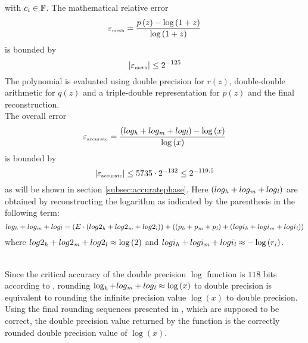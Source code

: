 with $c_i \in \F$.
The mathematical relative error 
$$\epsilon_{\mbox{\tiny meth}} = \frac{p\left( z \right) - \log\left( 1 + z \right)}{\log\left( 1 + z \right)}$$
is bounded by
$$\left \vert \epsilon_{\mbox{\tiny meth}} \right \vert \leq  2^{-125}$$
The polynomial is evaluated using double precision for $r\left( z \right)$, double-double arithmetic for
$q\left( z \right)$ and a triple-double representation for $p\left( z \right)$ and the final reconstruction.\\
The overall error 
$$\epsilon_{\mbox{\tiny accurate}} = \frac{\left( log_\hi + log_\mi + log_\lo \right) - \log\left( x \right)}{\log\left( x \right)}$$
is bounded by 
$$\left \vert \epsilon_{\mbox{\tiny accurate}} \right \vert \leq 5735 \cdot 2^{-132} \leq 2^{-119.5}$$
as will be shown in section \ref{subsec:accuratephase}. Here $\left( log_\hi + log_\mi + log_\lo \right)$ 
are obtained by reconstructing the logarithm as indicated by the parenthesis in the following term:
$$log_\hi + log_\mi + log_\lo = \left(E \cdot \left( log2_\hi + log2_\mi + log2_\lo \right) \right) + 
\left( \left( p_\hi + p_\mi + p_\lo \right) + \left(logi_\hi + logi_\mi + logi_\lo \right) \right)$$
where
$log2_\hi + log2_\mi + log2_\lo \approx \log\left( 2 \right)$ and $logi_\hi + logi_\mi + logi_\lo \approx -\log\left(r_i \right)$.\\ ~ \par
Since the critical accuracy of the double precision $\log$ function is $118$ bits according to 
\cite{DinDefLau2004LIP}, rounding $\log_\hi + log_\mi + log_\lo \approx \log\left( x \right)$ to double precision is equivalent 
to rounding the infinite precision value $\log\left( x \right)$ to double precision. 
Using the final rounding sequences presented in \cite{Lau05}, which are supposed to be correct, 
the double precision value returned by the function is the correctly rounded double precision value of 
$\log\left( x \right)$.
